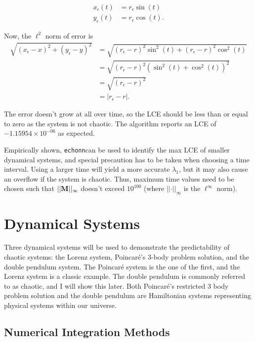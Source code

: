 \documentclass{article}
\newcommand{\echonn}{\texttt{echonn}}
\begin{document}
\begin{align*}
    x_\epsilon(t) &= r_\epsilon\sin(t) \\
    y_\epsilon(t) &= r_\epsilon\cos(t).
\end{align*}

Now, the $\ell^2$ norm of error is 
\begin{align*}
    \sqrt{(x_\epsilon - x)^2 + (y_\epsilon - y)^2} &= \sqrt{(r_\epsilon - r)^2\sin^2(t) + (r_\epsilon - r)^2\cos^2(t)} \\
    &= \sqrt{(r_\epsilon - r)^2(\sin^2(t) + \cos^2(t))^2} \\
    &= \sqrt{(r_\epsilon - r)^2} \\
    &= \vert r_\epsilon - r \vert.
\end{align*}

The error doesn't grow at all over time, so the LCE should be less than or
equal to zero as the system is not chaotic. The algorithm reports an LCE of
$-1.15954 \times 10^{-06}$ as expected.

Empirically shown, \echonn can be used to identify the max LCE of smaller
dynamical systems, and special precaution has to be taken when choosing a
time interval. Using a larger time will yield a more accurate $\lambda_1$,
but it may also cause an overflow if the system is chaotic. Thus, maximum
time values need to be chosen such that $\vert \vert \mathbf{M}\vert \vert_{\infty}$
doesn't exceed $10^{100}$ (where $\vert \vert \cdot \vert \vert_{\infty}$ is
the $\ell^\infty$ norm).

\section{Dynamical Systems}

Three dynamical systems will be used to demonstrate the predictability of
chaotic systems: the Lorenz system, Poincaré's 3-body problem solution, and
the double pendulum system. The Poincaré system is the one of the first, and
the Lorenz system is a classic example. The double pendulum is commonly
referred to as chaotic, and I will show this later. Both Poincaré's
restricted 3 body problem solution and the double pendulum are Hamiltonian
systems representing physical systems within our universe.

\subsection{Numerical Integration Methods}
\end{document}
